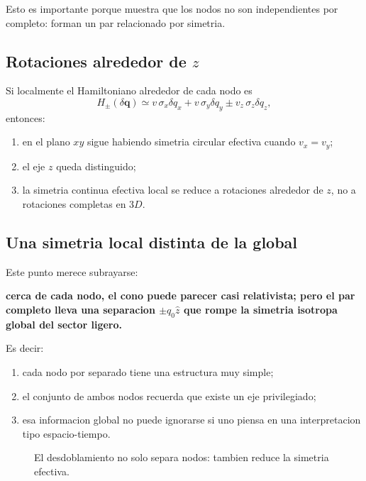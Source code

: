 Esto es importante porque muestra que los nodos no son independientes por completo: forman un par relacionado por simetria.

\subsection{Rotaciones alrededor de \(z\)}
Si localmente el Hamiltoniano alrededor de cada nodo es
\begin{equation}
H_\pm(\delta \bm{q})
\simeq
v\,\sigma_x \delta q_x
+
v\,\sigma_y \delta q_y
\pm
v_z\,\sigma_z \delta q_z,
\label{c11:eq:weyllocal}
\end{equation}
entonces:
\begin{enumerate}[label=\arabic*.]
    \item en el plano \(xy\) sigue habiendo simetria circular efectiva cuando \(v_x=v_y\);
    \item el eje \(z\) queda distinguido;
    \item la simetria continua efectiva local se reduce a rotaciones alrededor de \(z\), no a rotaciones completas en \(3D\).
\end{enumerate}

\subsection{Una simetria local distinta de la global}
Este punto merece subrayarse:
\begin{displayquote}
\textbf{cerca de cada nodo, el cono puede parecer casi relativista; pero el par completo lleva una separacion \(\pm q_0\hat{z}\) que rompe la simetria isotropa global del sector ligero.}
\end{displayquote}

Es decir:
\begin{enumerate}[label=\arabic*.]
    \item cada nodo por separado tiene una estructura muy simple;
    \item el conjunto de ambos nodos recuerda que existe un eje privilegiado;
    \item esa informacion global no puede ignorarse si uno piensa en una interpretacion tipo espacio-tiempo.
\end{enumerate}

\begin{figure}[h!]
\centering
{}
\caption{El desdoblamiento no solo separa nodos: tambien reduce la simetria efectiva.}
\end{figure}

